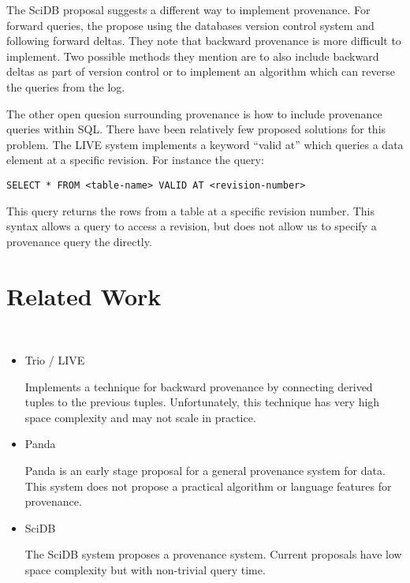 \documentclass[11pt]{article}
\begin{document}
The SciDB proposal suggests a different way to implement provenance. For forward queries, the propose using the databases version control system and following forward deltas. They note that backward provenance is more difficult to implement. Two possible methods they mention are to also include backward deltas as part of version control or to implement an algorithm which can reverse the queries from the log. 

The other open quesion surrounding provenance is how to include provenance queries within SQL. There have been relatively few proposed solutions for this problem. The LIVE system implements a keyword ``valid at'' which queries a data element at a specific revision. For instance the query:

\begin{verbatim}
SELECT * FROM <table-name> VALID AT <revision-number>
\end{verbatim}

This query returns the rows from a table at a specific revision number. This syntax allows a query to access a revision, but does not allow us to specify a provenance query the directly. 

\section{Related Work}


~\cite{buneman00}

\cite{simmhan05asurvey} 

\cite{simmhan_survey} 

\cite{glavic_dataprovenance}

\cite{queryprov_sig2010}

\cite{chapman_provstorage}

\cite{plt_stanford}

\begin{itemize}
\item Trio / LIVE \cite{widom2005trio, sarma2010live} 
  
Implements a technique for backward provenance by connecting derived tuples to the previous tuples. Unfortunately, this technique has very high space complexity and may not scale in practice. 

\item Panda \cite{ikeda2010panda} 

Panda is an early stage proposal for a general provenance system for data. This system does not propose a practical algorithm or language features for provenance. 

\item SciDB \cite{cudré2009demonstration}

The SciDB system proposes a provenance system. Current proposals have low space complexity but with non-trivial query time. 

\end{itemize}
\end{document}
